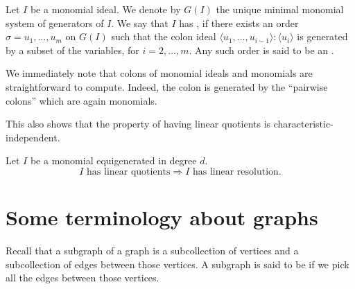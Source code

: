 \documentclass[12pt]{article}
\begin{document}
\begin{defn} \label{defn:linear-quotients}
	Let $I$ be a monomial ideal. We denote by $G(I)$ the unique minimal monomial system of generators of $I$. We say that $I$ has , if there exists an order $\sigma = u_{1}, \ldots, u_{m}$ on $G(I)$ such that the colon ideal $\langle u_{1}, \ldots, u_{i - 1} \rangle : \langle u_{i} \rangle$ is generated by a subset of the variables, for $i = 2, \ldots, m$. Any such order is said to be an .
\end{defn}

\begin{rem}
	We immediately note that colons of monomial ideals and monomials are straightforward to compute. Indeed, the colon is generated by the ``pairwise colons'' which are again monomials.

	This also shows that the property of having linear quotients is characteristic-independent.
\end{rem}

\begin{thm}
	Let $I$ be a monomial equigenerated in degree $d$. 
	\begin{equation*} 
		I \text{ has linear quotients} \Rightarrow I \text{ has linear resolution}.
	\end{equation*}
\end{thm}

\section{Some terminology about graphs}

Recall that a subgraph of a graph is a subcollection of vertices and a subcollection of edges between those vertices. A subgraph is said to be  if we pick all the edges between those vertices. 
\end{document}
